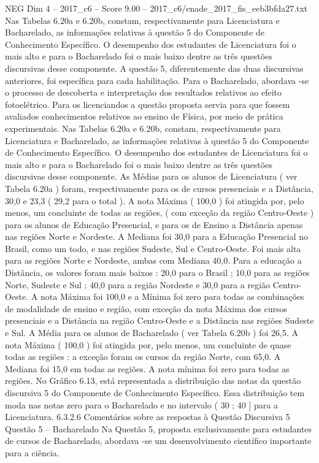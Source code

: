 \begin{textsample}{NEG Dim 4 – 2017\_c6 – Score 9.00 – 2017\_c6/enade\_2017\_fis\_eeb3bfda27.txt}
Nas Tabelas 6.20a e 6.20b, constam, respectivamente para Licenciatura e Bacharelado, as informações relativas à questão 5 do Componente de Conhecimento Específico.
O desempenho dos estudantes de Licenciatura foi o mais alto e para o Bacharelado foi o mais baixo dentre as três questões discursivas desse componente.
A questão 5, diferentemente das duas discursivas anteriores, foi específica para cada habilitação.
Para o Bacharelado, abordava -se o processo de descoberta e interpretação dos resultados relativos ao efeito fotoelétrico.
Para os licenciandos a questão proposta servia para que fossem avaliados conhecimentos relativos ao ensino de Física, por meio de prática experimentais.
Nas Tabelas 6.20a e 6.20b, constam, respectivamente para Licenciatura e Bacharelado, as informações relativas à questão 5 do Componente de Conhecimento Específico.
O desempenho dos estudantes de Licenciatura foi o mais alto e para o Bacharelado foi o mais baixo dentre as três questões discursivas desse componente.
As Médias para os alunos de Licenciatura ( ver Tabela 6.20a ) foram, respectivamente para os de cursos presenciais e a Distância, 30,0 e 23,3 ( 29,2 para o total ).
A nota Máxima ( 100,0 ) foi atingida por, pelo menos, um concluinte de todas as regiões, ( com exceção da região Centro-Oeste ) para os alunos de Educação Presencial, e para os de Ensino a Distância apenas nas regiões Norte e Nordeste.
A Mediana foi 30,0 para a Educação Presencial no Brasil, como um todo, e nas regiões Sudeste, Sul e Centro-Oeste.
Foi mais alta para as regiões Norte e Nordeste, ambas com Mediana 40,0.
Para a educação a Distância, os valores foram mais baixos : 20,0 para o Brasil ; 10,0 para as regiões Norte, Sudeste e Sul ; 40,0 para a região Nordeste e 30,0 para a região Centro-Oeste.
A nota Máxima foi 100,0 e a Mínima foi zero para todas as combinações de modalidade de ensino e região, com exceção da nota Máxima dos cursos presenciais e a Distância na região Centro-Oeste e a Distância nas regiões Sudeste e Sul.
A Média para os alunos de Bacharelado ( ver Tabela 6.20b ) foi 26,5.
A nota Máxima ( 100,0 ) foi atingida por, pelo menos, um concluinte de quase todas as regiões : a exceção foram os cursos da região Norte, com 65,0.
A Mediana foi 15,0 em todas as regiões.
A nota mínima foi zero para todas as regiões.
No Gráfico 6.13, está representada a distribuição das notas da questão discursiva 5 do Componente de Conhecimento Específico.
Essa distribuição tem moda nas notas zero para o Bacharelado e no intervalo ( 30 ; 40 ] para a Licenciatura. 6.3.2.6 Comentários sobre as respostas à Questão Discursiva 5 Questão 5 – Bacharelado Na Questão 5, proposta exclusivamente para estudantes de cursos de Bacharelado, abordava -se um desenvolvimento científico importante para a ciência.

\end{textsample}

